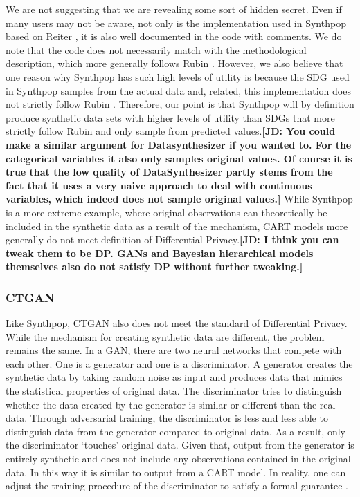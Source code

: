 \documentclass[runningheads]{llncs}
\newcommand{\jd}[1]{\scriptsize {\bf \color{red}[JD: #1]}\normalsize}
\begin{document}
We are not suggesting that we are revealing some sort of hidden secret.  Even if many users may not be aware, not only is the implementation used in Synthpop based on Reiter \cite{reiter2005using}, it is also well documented in the code with comments.  We do note that the code does not necessarily match with the methodological description, which more generally follows Rubin \cite{rubin1993statistical}.  However, we also believe that one reason why Synthpop has such high levels of utility is because the SDG used in Synthpop samples from the actual data and, related, this implementation does not strictly follow Rubin \cite{rubin1993statistical}.   Therefore, our point is that Synthpop will by definition produce synthetic data sets with higher levels of utility than SDGs that more strictly follow Rubin and only sample from predicted values.\jd{You could make a similar argument for Datasynthesizer if you wanted to. For the categorical variables it also only samples original values. Of course it is true that the low quality of DataSynthesizer partly stems from the fact that it uses a very naive approach to deal with continuous variables, which indeed does not sample original values.}  While Synthpop is a more extreme example, where original observations can theoretically be included in the synthetic data as a result of the mechanism, CART models more generally do not meet definition of Differential Privacy.\jd{I think you can tweak them to be DP. GANs and Bayesian hierarchical models themselves also do not satisfy DP without further tweaking.}

\subsubsection{CTGAN}

Like Synthpop, CTGAN also does not meet the standard of Differential Privacy.  While the mechanism for creating synthetic data are different, the problem remains the same.  In a GAN, there are two neural networks that compete with each other.  One is a generator and one is a discriminator.  A generator creates the synthetic data by taking random noise as input and produces data that mimics the statistical properties of original data.  The discriminator tries to distinguish whether the data created by the generator is similar or different than the real data.  Through adversarial training, the discriminator is less and less able to distinguish data from the generator compared to original data.  As a result, only the discriminator `touches' original data.  Given that, output from the generator is entirely synthetic and does not include any observations contained in the original data.  In this way it is similar to output from a CART model.  In reality, one can adjust the training procedure of the discriminator to satisfy a formal guarantee \cite{beaulieu2019privacy,neunhoeffer2020private}.
\end{document}

